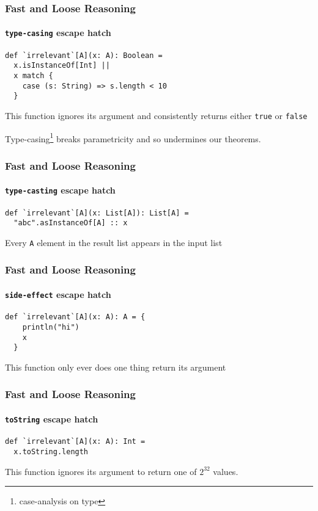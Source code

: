 \begin{frame}[fragile]
\frametitle{Fast and Loose Reasoning}
\framesubtitle{\lstinline{type-casing} escape hatch}
\begin{lstlisting}[style=scala]
def `irrelevant`[A](x: A): Boolean = 
  x.isInstanceOf[Int] ||
  x match {
    case (s: String) => s.length < 10
  }
\end{lstlisting}
\begin{theorem}This function ignores its argument and consistently returns either \lstinline{true} or \lstinline{false}\end{theorem}
Type-casing\footnote{case-analysis on type} breaks parametricity and so undermines our theorems.
\end{frame}

\begin{frame}[fragile]
\frametitle{Fast and Loose Reasoning}
\framesubtitle{\lstinline{type-casting} escape hatch}
\begin{lstlisting}[style=scala]
def `irrelevant`[A](x: List[A]): List[A] = 
  "abc".asInstanceOf[A] :: x  
\end{lstlisting}
\begin{theorem}Every \lstinline{A} element in the result list appears in the input list\end{theorem}
\end{frame}

\begin{frame}[fragile]
\frametitle{Fast and Loose Reasoning}
\framesubtitle{\lstinline{side-effect} escape hatch}
\begin{lstlisting}[style=scala]
def `irrelevant`[A](x: A): A = {
    println("hi")
    x
  }
\end{lstlisting}
\begin{theorem}This function only ever does one thing \textemdash return its argument \end{theorem}
\end{frame}

\begin{frame}[fragile]
\frametitle{Fast and Loose Reasoning}
\framesubtitle{\lstinline{toString} escape hatch}
\begin{lstlisting}[style=scala]
def `irrelevant`[A](x: A): Int =
  x.toString.length
\end{lstlisting}
\begin{theorem}This function ignores its argument to return one of {${2^{32}}$} values. \end{theorem}
\end{frame}

